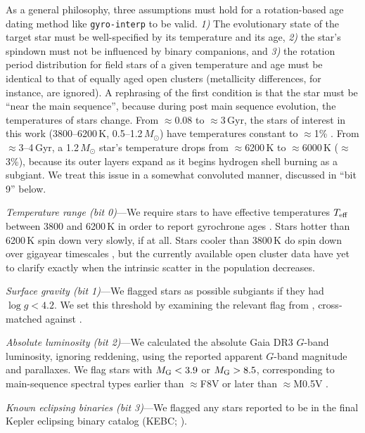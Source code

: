 \documentclass[11pt,twocolumn,tighten]{aastex63}
\begin{document}
As a general philosophy, three assumptions must hold for a
rotation-based age dating method like \texttt{gyro-interp} to be
valid.  {\it 1)} The evolutionary state of the target star must be
well-specified by its temperature and its age, {\it 2)} the star's
spindown must not be influenced by binary companions, and {\it 3)} the
rotation period distribution for field stars of a given temperature
and age must be identical to that of equally aged open clusters
(metallicity differences, for instance, are ignored).  A rephrasing of
the first condition is that the star must be ``near the main
sequence'', because during post main sequence evolution, the
temperatures of stars change.  From $\approx$0.08 to $\approx$3\,Gyr,
the stars of interest in this work (3800--6200\,K,
0.5--1.2\,$M_\odot$) have temperatures constant to $\approx$1\%
\citep{Choi_2016}.  From $\approx$3--4\,Gyr, a 1.2\,$M_\odot$ star's
temperature drops from $\approx$6200\,K to $\approx$6000\,K
($\approx$3\%), because its outer layers expand as it begins hydrogen
shell burning as a subgiant.  We treat this issue in a somewhat
convoluted manner, discussed in ``bit 9'' below.

{\it Temperature range (bit 0)}---We require stars to have effective
temperatures $T_{\rm eff}$ between 3800 and 6200\,K in order to report
gyrochrone ages \citep{Bouma_2023}.   Stars hotter than 6200\,K spin
down very slowly, if at all.  Stars cooler than 3800\,K do spin down
over gigayear timescales
\citep{2016ApJ...821...93N,2023ApJ...954L..50E,2024arXiv240312129C},
but the currently available open cluster data have yet to clarify
exactly when the intrinsic scatter in the population decreases.

{\it Surface gravity (bit 1)}---We flagged stars as possible subgiants
if they had $\log g < 4.2$.  We set this threshold by examining the
relevant flag from \citet{berger_2018_radii_evolnstates},
cross-matched against \citet{Berger_2020a_catalog}.

{\it Absolute luminosity (bit 2)}---We calculated the absolute Gaia
DR3 $G$-band luminosity, ignoring reddening, using the reported
apparent $G$-band magnitude and parallaxes.  We flag stars with
$M_{\rm G} < 3.9$ or $M_{\rm G} > 8.5$, corresponding to main-sequence
spectral types earlier than $\approx$F8V or later than $\approx$M0.5V
\citep{Pecaut_2013}.

{\it Known eclipsing binaries (bit 3)}---We flagged any stars reported
to be in the final Kepler eclipsing binary catalog (KEBC;
\citealt{2016AJ....151...68K}).
\end{document}
